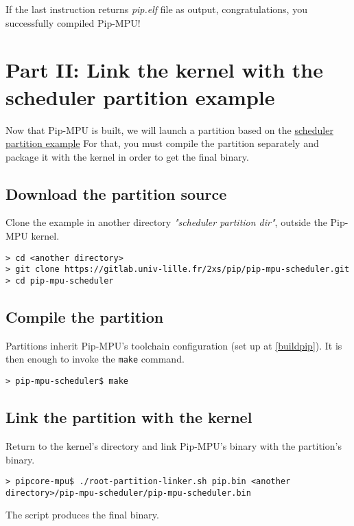 \documentclass[10pt,a4paper,titlepage]{refart}
\begin{document}
If the last instruction returns \textit{pip.elf} file as output, congratulations, you successfully compiled Pip-MPU!

\section{Part II: Link the kernel with the scheduler partition example} \label{second}
Now that Pip-MPU is built, we will launch a partition based on the \href{(https://gitlab.univ-lille.fr/2xs/pip/pip-mpu-scheduler)}{scheduler partition example}
For that, you must compile the partition separately and package it with the kernel in order to get the final binary.

\subsection{Download the partition source}
Clone the example in another directory \textit{"scheduler partition dir"}, outside the Pip-MPU kernel.

\begin{lstlisting}[style=BashStyle]
> cd <another directory>
> git clone https://gitlab.univ-lille.fr/2xs/pip/pip-mpu-scheduler.git
> cd pip-mpu-scheduler
\end{lstlisting}

\subsection{Compile the partition}
Partitions inherit Pip-MPU's toolchain configuration (set up at \ref{buildpip}).
It is then enough to invoke the \texttt{make} command.

\begin{lstlisting}[style=BashStyle]
> pip-mpu-scheduler$ make
\end{lstlisting}

\subsection{Link the partition with the kernel}
Return to the kernel's directory and link Pip-MPU's binary with the partition's binary.

\begin{lstlisting}[style=BashStyle]
> pipcore-mpu$ ./root-partition-linker.sh pip.bin <another directory>/pip-mpu-scheduler/pip-mpu-scheduler.bin
\end{lstlisting}

The script produces the final binary.
\end{document}
